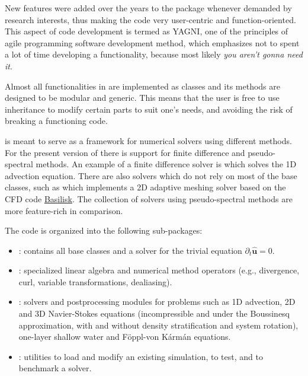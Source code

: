New features were added over the years to the package whenever demanded by
research interests, thus making the code very user-centric and
function-oriented.  This aspect of code development is termed as YAGNI, one of
the principles of agile programming software development method, which
emphasizes not to spent a lot of time developing a functionality, because most
likely \emph{you aren't gonna need it}.

Almost all functionalities in  are implemented as classes and its
methods are designed to be modular and generic.  This means that the user is free
to use inheritance to modify certain parts to suit one's needs, and avoiding the
risk of breaking a functioning code.



 is meant to serve as a framework for numerical solvers using
different methods. For the present version of  there is support for
finite difference and pseudo-spectral methods. An example of a finite difference
solver is  which solves the 1D advection
equation. There are also solvers which do not rely on most of the base classes,
such as  which implements a 2D adaptive meshing
solver based on the CFD code \href{http://basilisk.fr/}{Basilisk}. The collection
of solvers using pseudo-spectral methods are more feature-rich in comparison.

The code is organized into the following sub-packages:

\begin{itemize}
\item {}: contains all base classes and a solver for the
trivial equation $\partial_t \mathbf{\hat{u}} = 0 $.
\item {}: specialized linear algebra and numerical
method operators (e.g., divergence, curl, variable transformations, dealiasing).

\item {}: solvers and postprocessing modules for
problems such as 1D advection, 2D and 3D Navier-Stokes equations (incompressible
and under the Boussinesq approximation, with and without density stratification
and system rotation), one-layer shallow water and F\"oppl-von K\'arm\'an
equations.

\item {}: utilities to load and modify an existing
simulation, to test, and to benchmark a solver.
\end{itemize}

